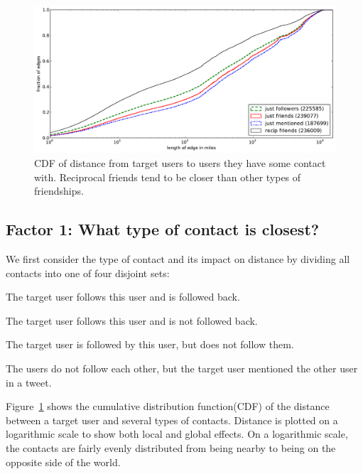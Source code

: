 \documentclass{sig-alternate}
\begin{document}
\begin{figure}[tb]
\centering
\includegraphics[width=.9\linewidth]{figures/edge_types_cuml.pdf}
\caption{
CDF of distance from target users to users they have some contact
with.
%
Reciprocal friends tend to be closer than other types of friendships.
}
\label{fig:EdgeTypesCuml}
\vspace{-2pt}
\end{figure}


\subsection{Factor 1: What type of contact is closest?}
We first consider the type of contact and its impact on distance by dividing
all contacts into one of four disjoint sets:

\begin{description}
    \setlength{\itemsep}{0pt}
\item[Reciprocal Friend:] The target user follows this user and is followed
    back.
\item[Just Friend:] The target user follows this user and is not followed
    back.
\item[Just Follower:] The target user is followed by this user, but does
    not follow them.
\item[Just Mentioned:] The users do not follow each other, but the target
    user mentioned the other user in a tweet.
\end{description}

Figure~\ref{fig:EdgeTypesCuml} shows the cumulative distribution
function(CDF) of the distance between a target user and several types of
contacts.
%
Distance is plotted on a logarithmic scale to show both local and
global effects.
%
On a logarithmic scale, the contacts are fairly evenly distributed from being
nearby to being on the opposite side of the world.
%
%
%
\end{document}
